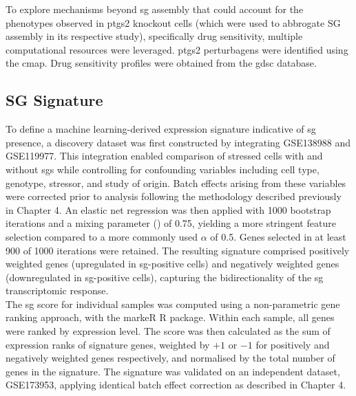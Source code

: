 To explore mechanisms beyond \gls{sg} assembly that could account for the phenotypes observed in \gls{ptgs2} knockout cells (which were used to abbrogate SG assembly in its respective study), specifically drug sensitivity, multiple computational resources were leveraged. \gls{ptgs2} perturbagens were identified using the \gls{cmap}\cite{subramanian_next_2017}. Drug sensitivity profiles were obtained from the \gls{gdsc}\cite{yang_genomics_2012} database. 

\subsection{SG Signature}

To define a machine learning-derived expression signature indicative of \gls{sg} presence, a discovery dataset was first constructed by integrating GSE138988\cite{matheny_transcriptome-wide_2019} and GSE119977\cite{matheny_rna_2021, matheny_corrigendum_2023}. This integration enabled comparison of stressed cells with and without \glspl{sg} while controlling for confounding variables including cell type, genotype, stressor, and study of origin. Batch effects arising from these variables were corrected prior to analysis following the methodology described previously in Chapter 4\cite{schneider_voyager_2024}. An elastic net regression was then applied with 1000 bootstrap iterations and a mixing parameter (\alpha) of 0.75, yielding a more stringent feature selection compared to a more commonly used $\alpha$ of 0.5\cite{zou_regularization_2005}. Genes selected in at least 900 of 1000 iterations were retained\cite{zou_regularization_2005}. The resulting signature comprised positively weighted genes (upregulated in \gls{sg}-positive cells) and negatively weighted genes (downregulated in \gls{sg}-positive cells), capturing the bidirectionality of the \gls{sg} transcriptomic response.
\\
\linebreak
\noindent
The \gls{sg} score for individual samples was computed using a non-parametric gene ranking approach, with the markeR R package\cite{martins-silva_exploring_2025}. Within each sample, all genes were ranked by expression level. The score was then calculated as the sum of expression ranks of signature genes, weighted by $+1$ or $-1$ for positively and negatively weighted genes respectively, and normalised by the total number of genes in the signature. The signature was validated on an independent dataset, GSE173953\cite{paget_stress_2023}, applying identical batch effect correction as described in Chapter 4\cite{schneider_voyager_2024}.

